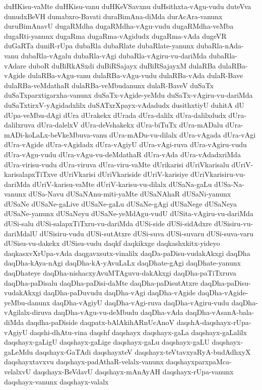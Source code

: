 {duHKisu-vaMte
duHKisu-vanu
duHKeVSavxnu
duHsithxta-vAgu-vudu
duteVva
dunudxBeVH
dumabxro-Bavati
duraBimAna-diMda
durAcAra-vanunx
duruBimAnavU
dugaRMdha
dugaRMdha-vAgu-vudu
dugaRMdha-veMba
dugaRti-yanunx
dugaRma
dugaRma-vAgidudx
dugaRma-vAda
dugeVR
duGaRTa
duniR-rUpa
dubaRla
dubaRlate
dubaRlate-yanunx
dubaRla-nAda-vanu
dubaRla-vAgalu
dubaRla-vAgi
dubaRla-vAgiru-vu-dariMda
dubaRla-vAdare
duboR
duBiRkASxdi
duBiRSajayx
duBiRSajayxM
dulaRBa
dulaRBa-vAgide
dulaRBa-vAgu-vanu
dulaRBa-vAgu-vudu
dulaRBa-vAda
dulaR-Bave
dulaRBa-veMdathaR
dulaRBa-veMbudanunx
dulaR-BaveV
duSaTx
duSaTxparxtigarxha-vanunx
duSaTx-vAgide-yeMdu
duSaTx-vAgiru-vu-dariMda
duSaTxtirxV-yAgidadxlilx
duSATxrXpayx-vAdadudx
dusithxtiyU
duhitA
dU
dUpa-veMbu-dAgi
dUra
dUrakekx
dUrada
dUra-dalilx
dUra-dalilxdudx
dUra-dalilxruva
dUra-dalelxV
dUra-deVshakekx
dUra-biTuTx
dUra-mADalu
dUra-mADi-koLaLx-beVkeMbuva-vanu
dUra-mADu-vu-dilalx
dUra-vAgada
dUra-vAgi
dUra-vAgide
dUra-vAgidadx
dUra-vAgiyU
dUra-vAgi-ruva
dUra-vAgiru-vudu
dUra-vAgu-vudu
dUra-vAgu-vu-deMdathaR
dUra-vAda
dUra-vAdadxriMda
dUra-virisu-vudu
dUra-viruva
dUra-viru-vaMte
dUrikarisi
dUriVkarisalu
dUriV-karisalapxTiTxve
dUriVkarisi
dUriVkariside
dUriV-karisiye
dUriVkarisiru-vu-dariMda
dUriV-karisu-vaMte
dUriV-karisu-vu-dilalx
dUSaNa-gaLu
dUSa-Na-vanunx
dUSa-Navu
dUSaNAnu-miti-yaMte
dUSaNAhaR
dUSaNi-yanunx
dUSaNe
dUSaNe-gaLive
dUSaNe-gaLu
dUSaNe-gAgi
dUSaNege
dUSaNeya
dUSaNe-yanunx
dUSaNeyu
dUSaNe-yeMdAgu-vudU
dUSita-vAgiru-vu-dariMda
dUSi-salu
dUSi-salapxTiTxru-vu-dariMda
dUSi-side
dUSi-sidAdxre
dUSisiru-vu-dariMdalU
dUSisiru-vudu
dUSi-sutAtxre
dUSi-suva
dUSi-suvaru
dUSi-suva-varu
dUSisu-vu-dakekx
dUSisu-vudu
daqkf
daqkikxge
daqkashxkitx-yideyo
daqkasxvXrUpa-vAda
daqgavxsutx-vinalilx
daqDa-paDisu-vudakAkxgi
daqDha
daqDha-kAya-nAgi
daqDha-kA-yAvuLaLx
daqDhate-gAgi
daqDhate-yanunx
daqDhateye
daqDha-nishacxyAvuMTAguvu-dakAkxgi
daqDha-paTiTxruva
daqDha-paDisalu
daqDha-paDisi-daMte
daqDha-paDisutAtxre
daqDha-paDisu-vudakAkxgi
daqDha-paDuvudu
daqDha-vAgi
daqDha-vAgide
daqDha-vAgide-yeMbu-danunx
daqDha-vAgiyU
daqDha-vAgi-ruva
daqDha-vAgiru-vudu
daqDha-vAgilalx-diruva
daqDha-vAgu-vu-deMbudu
daqDha-vAda
daqDha-vAsanA-bala-diMda
daqdha-paDiside
daqpatx-bAlAkihARnUcAnoV
daqshA-daqshayx-rUpa-vAgiyU
daqshi-dhAtu-vina
daqshf
daqshayx
daqshayx-gaLa
daqshayx-gaLalilx
daqshayx-gaLigU
daqshayx-gaLige
daqshayx-gaLu
daqshayx-gaLU
daqshayx-gaLeMdu
daqshayx-GaTAdi
daqshayxteV
daqshayx-teVtavxyaRyA-budAdhxyX
daqshayxtavxvu
daqshayx-padAthaR-velalx-vanunx
daqshayxparxpaMca-velalxvU
daqshayx-BeVdavU
daqshayx-mAnAyAH
daqshayx-rUpa-vanunx
daqshayx-vanunx
daqshayx-valalx
}
